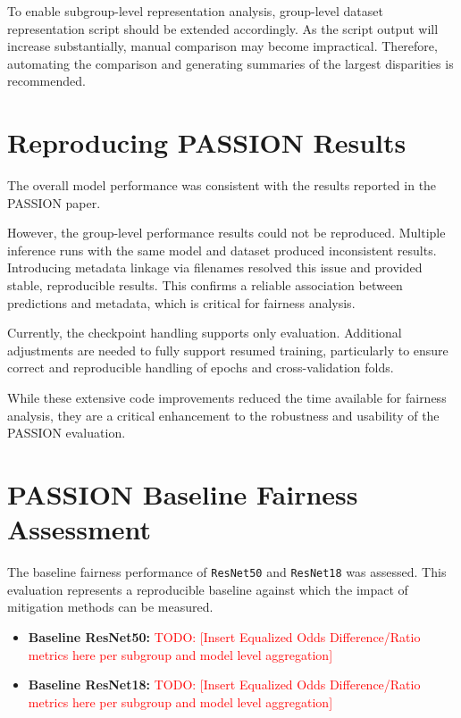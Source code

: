 \documentclass[12pt, a4paper, oneside]{book}   	%
\renewcommand{\todo}[1]{\textcolor{red}{TODO: #1}}
\begin{document}
		To enable subgroup-level representation analysis, group-level dataset representation script should be extended accordingly. As the script output will increase substantially, manual comparison may become impractical. Therefore, automating the comparison and generating summaries of the largest disparities is recommended.
		
		
		\section{Reproducing PASSION Results}
		The overall model performance was consistent with the results reported in the PASSION paper.
		
		However, the group-level performance results could not be reproduced. Multiple inference runs with the same model and dataset produced inconsistent results. Introducing metadata linkage via filenames resolved this issue and provided stable, reproducible results. This confirms a reliable association between predictions and metadata, which is critical for fairness analysis.
		
		Currently, the checkpoint handling supports only evaluation. Additional adjustments are needed to fully support resumed training, particularly to ensure correct and reproducible handling of epochs and cross-validation folds.
		
		
		While these extensive code improvements reduced the time available for fairness analysis, they are a critical enhancement to the robustness and usability of the PASSION evaluation.
		
		\section{PASSION Baseline Fairness Assessment} \label{sec:evaluation}
		
		The baseline fairness performance of \texttt{ResNet50} and \texttt{ResNet18} was assessed. This evaluation represents a reproducible baseline against which the impact of mitigation methods can be measured.
		
		\begin{itemize}
			\item \textbf{Baseline ResNet50:} \todo{[Insert Equalized Odds Difference/Ratio metrics here per subgroup and model level aggregation]}
			\item \textbf{Baseline ResNet18:} \todo{[Insert Equalized Odds Difference/Ratio metrics here per subgroup and model level aggregation]}
		\end{itemize}
		
\end{document}

